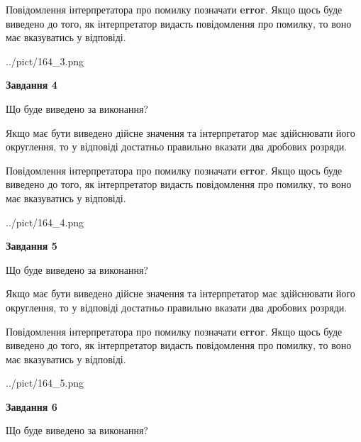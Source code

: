 \documentclass[12pt, ukrainian]{article}
\begin{document}
{\begin {Large}
Повідомлення інтерпретатора про помилку позначати \textbf{error}.
Якщо щось буде виведено до того, як інтерпретатор видасть повідомлення про помилку, 
то воно має вказуватись у відповіді. \par

\begin{center}
	{../pict/164_3.png}
\end{center}
\newpage

{\begin {center}\textbf{Завдання 4}\end {center}}\par
Що буде виведено за виконання? \par

Якщо має бути виведено дійсне значення та інтерпретатор має здійснювати його округлення, 
то у відповіді достатньо правильно вказати два дробових розряди.

Повідомлення інтерпретатора про помилку позначати \textbf{error}.
Якщо щось буде виведено до того, як інтерпретатор видасть повідомлення про помилку, 
то воно має вказуватись у відповіді. \par

\begin{center}
	{../pict/164_4.png}
\end{center}
\newpage

{\begin {center}\textbf{Завдання 5}\end {center}}\par
Що буде виведено за виконання? \par

Якщо має бути виведено дійсне значення та інтерпретатор має здійснювати його округлення, 
то у відповіді достатньо правильно вказати два дробових розряди.

Повідомлення інтерпретатора про помилку позначати \textbf{error}.
Якщо щось буде виведено до того, як інтерпретатор видасть повідомлення про помилку, 
то воно має вказуватись у відповіді. \par

\begin{center}
	{../pict/164_5.png}
\end{center}
\newpage

{\begin {center}\textbf{Завдання 6}\end {center}}\par
Що буде виведено за виконання? \par


\end{Large}}
\end{document}
